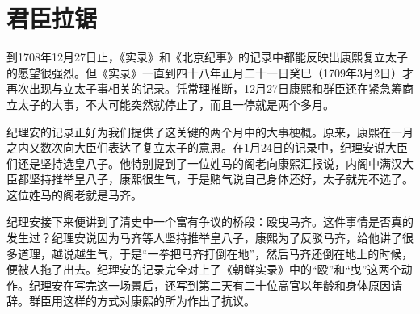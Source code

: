 \begin{sectionnotes}









\end{sectionnotes}
\section{君臣拉锯}


到1708年12月27日止，《实录》和《北京纪事》的记录中都能反映出康熙复立太子的愿望很强烈。但《实录》一直到四十八年正月二十一日癸巳（1709年3月2日）才再次出现与立太子事相关的记录。凭常理推断，12月27日康熙和群臣还在紧急筹商立太子的大事，不大可能突然就停止了，而且一停就是两个多月。



纪理安的记录正好为我们提供了这关键的两个月中的大事梗概。原来，康熙在一月之内又数次向大臣们表达了复立太子的意思。在1月24日的记录中，纪理安说大臣们还是坚持选皇八子。他特别提到了一位姓马的阁老向康熙汇报说，内阁中满汉大臣都坚持推举皇八子，康熙很生气，于是赌气说自己身体还好，太子就先不选了。这位姓马的阁老就是马齐。



纪理安接下来便讲到了清史中一个富有争议的桥段：殴曳马齐。这件事情是否真的发生过？纪理安说因为马齐等人坚持推举皇八子，康熙为了反驳马齐，给他讲了很多道理，越说越生气，于是“一拳把马齐打倒在地”，然后马齐还倒在地上的时候，便被人拖了出去。纪理安的记录完全对上了《朝鲜实录》中的“殴”和“曳”这两个动作。纪理安在写完这一场景后，还写到第二天有二十位高官以年龄和身体原因请辞。群臣用这样的方式对康熙的所为作出了抗议。



